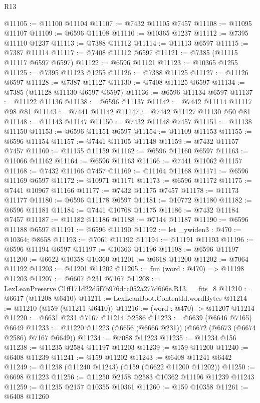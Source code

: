 \begin{lexlean}{R13}
\begin{coremodule}
@11105 := @11100 @11104
@11107 := @7432 @11105 @7457
@11108 := @11095 @11107
@11109 := @6596 @11108
@11110 := @10365 @1237
@11112 := @7395 @11110 @1237
@11113 := @7388 @11112
@11114 := @11113 @6597
@11115 := @7387 @11114
@11117 := @7408 @11112 @6597
@11121 := @7385 (@11115 @11117 @6597 @6597)
@11122 := @6596 @11121
@11123 := @10365 @1255
@11125 := @7395 @11123 @1255
@11126 := @7388 @11125
@11127 := @11126 @6597
@11128 := @7387 @11127
@11130 := @7408 @11125 @6597
@11134 := @7385 (@11128 @11130 @6597 @6597)
@11136 := @6596 @11134 @6597
@11137 := @11122 @11136
@11138 := @6596 @11137
@11142 := @7442 @11114 @11117 @98 @81
@11143 := @7441 @11142
@11147 := @7442 @11127 @11130 @50 @81
@11148 := @11143 @11147
@11150 := @7432 @11148 @7457
@11151 := @11138 @11150
@11153 := @6596 @11151 @6597
@11154 := @11109 @11153
@11155 := @6596 @11154
@11157 := @7441 @11105 @11148
@11159 := @7432 @11157 @7457
@11160 := @11155 @11159
@11162 := @6596 @11160 @6597
@11163 := @11066 @11162
@11164 := @6596 @11163
@11166 := @7441 @11062 @11157
@11168 := @7432 @11166 @7457
@11169 := @11164 @11168
@11171 := @6596 @11169 @6597
@11172 := @10971 @11171
@11173 := @6596 @11172
@11175 := @7441 @10967 @11166
@11177 := @7432 @11175 @7457
@11178 := @11173 @11177
@11180 := @6596 @11178 @6597
@11181 := @10772 @11180
@11182 := @6596 @11181
@11184 := @7441 @10768 @11175
@11186 := @7432 @11184 @7457
@11187 := @11182 @11186
@11188 := @7144 @11187
@11190 := @6596 @11188 @6597
@11191 := @6596 @11190
@11192 := let _ywiden3 : @470 := @10364; @8658
@11193 := @7061 @11192
@11194 := @11191 @11193
@11196 := @6596 @11194 @6597
@11197 := @10363 @11196
@11198 := @6596 @11197
@11200 := @6622 @10358 @10360
@11201 := @6618 @11200
@11202 := @7064 @11192
@11203 := @11201 @11202
@11205 := fun (word : @470) => @11198 @11203
@11207 := @6607 @231 @7167
@11208 := LexLeanPreserve.C1ff171d22d5f7b976dcc052a277d666e.R13.__fits_8
@11210 := @6617 (@11208 @6410)
@11211 := LexLeanBoot.ContentId.wordBytes
@11214 := @11210 (@159 (@11211 @6410))
@11216 := (word : @470) -> @11207 @11214
@11220 := @6631 @231 @7167 @11214 @2586
@11223 := @6639 (@6646 @7165) @6649
@11233 := @11220 @11223 (@6656 (@6666 @231)) (@6672 (@6673 (@6674 @2586) @7167 @6649))
@11234 := @7088 @11223
@11235 := @11234 @156
@11238 := @11235 @2584 @11197 @11203
@11239 := @159 @11200
@11240 := @6408 @11239
@11241 := @159 @11202
@11243 := @6408 @11241 @6442
@11249 := @11238 (@11240 @11243) (@159 (@6622 @11200 @11202))
@11250 := @6698 @11223
@11256 := @11250 @2158 @2583 @10362 @11196 @11239 @11243
@11259 := @11235 @2157 @10355 @10361
@11260 := @159 @10358
@11261 := @6408 @11260

\end{coremodule}
\end{lexlean}
